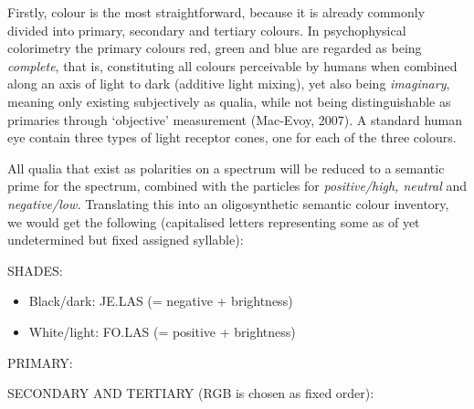 \noindent Firstly, colour is the most straightforward, because it is already commonly divided into primary, secondary and tertiary colours. In psychophysical colorimetry the primary colours red, green and blue are regarded as being \textit{complete}, that is, constituting all colours perceivable by humans when combined along an axis of light to dark (additive light mixing), yet also being \textit{imaginary}, meaning only existing subjectively as qualia, while not being distinguishable as primaries through ‘objective’ measurement (Mac-Evoy, 2007). A standard human eye contain three types of light receptor cones, one for each of the three colours. 

All qualia that exist as polarities on a spectrum will be reduced to a semantic prime for the spectrum, combined with the particles for \textit{positive/high, neutral} and \textit{negative/low.} Translating this into an oligosynthetic semantic colour inventory, we would get the following (capitalised letters representing some as of yet undetermined but fixed assigned syllable): 

\vspace{0.1cm}

SHADES: 
\begin{itemize}

\item    Black/dark: JE.LAS \je \las (= negative + brightness) 

    \item White/light: FO.LAS \fo \las (= positive + brightness) 
\end{itemize}
\quad

PRIMARY: 
\quad


\noindent SECONDARY AND TERTIARY (RGB is chosen as fixed order): 

